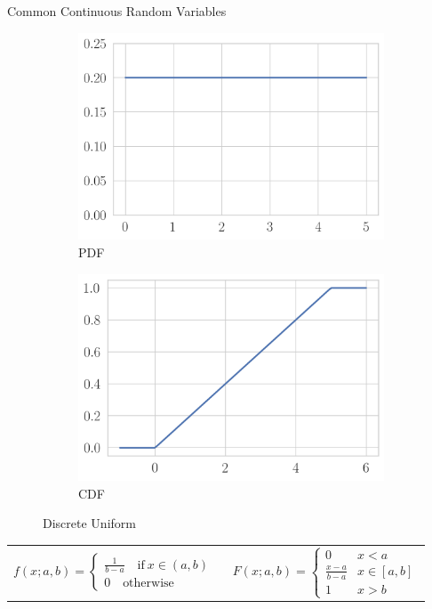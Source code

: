 \documentclass[11pt, xcolor={dvipsnames}, hyperref={colorlinks, allcolors=Blue}]{beamer}
\begin{document}
\begin{frame}{Common Continuous Random Variables}

\begin{figure}[t]
	\begin{subfigure}[b]{0.4\textwidth}
		\centering
		\includegraphics[width=\textwidth]{continuous_uniform_pdf.png}
		\caption*{PDF}
	\end{subfigure}
	\begin{subfigure}[b]{0.4\textwidth}
		\centering
		\includegraphics[width=\textwidth]{continuous_uniform_cdf.png}
		\caption*{CDF}
	\end{subfigure}
\caption{Discrete Uniform}
\end{figure}

\begin{center}
\begin{tabular}{cc}
$f(x; a, b) = \begin{cases}\frac{1}{b-a} \quad \text{if} \ x \in (a,b)\\0 \quad \text{otherwise}\end{cases}$ & \ 
$F(x; a, b) = \begin{cases} 0 & x < a \\ \frac{x-a}{b-a} & x \in [a, b] \\ 1 & x> b\end{cases}$
\end{tabular}
\end{center}



\end{frame}
\end{document}
